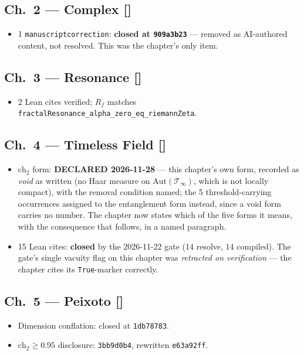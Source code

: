 \subsection*{Ch.~2 --- Complex \hfill [\checkmark]}
\begin{itemize}
\item 1 \texttt{manuscriptcorrection}: \textbf{closed at \texttt{909a3b23}} ---
removed as AI-authored content, not resolved. This was the chapter's only item.
\end{itemize}

\subsection*{Ch.~3 --- Resonance \hfill [\checkmark]}
\begin{itemize}
\item 2 Lean cites verified; $R_f$ matches \texttt{fractalResonance\_alpha\_zero\_eq\_riemannZeta}.
\end{itemize}

\subsection*{Ch.~4 --- Timeless Field \hfill [\checkmark]}
\begin{itemize}
\item $\mathrm{ch}_2$ form: \textbf{DECLARED 2026-11-28} --- this chapter's own form, recorded as \emph{void} as written (no Haar measure on $\mathrm{Aut}(\mathcal{T}_\infty)$, which is not locally compact), with the removal condition named; the 5 threshold-carrying occurrences assigned to the entanglement form instead, since a void form carries no number. The chapter now states which of the five forms it means, with the consequence that follows, in a named paragraph.
\item 15 Lean cites: \textbf{closed} by the 2026-11-22 gate (14 resolve, 14
compiled). The gate's single vacuity flag on this chapter was \emph{retracted
on verification} --- the chapter cites its \texttt{True}-marker correctly.
\end{itemize}

\subsection*{Ch.~5 --- Peixoto \hfill [\checkmark]}
\begin{itemize}
\item Dimension conflation: closed at \texttt{1db78783}.
\item $\mathrm{ch}_2 \geq 0.95$ disclosure: \texttt{3bb9d0b4}, rewritten \texttt{e63a92ff}.
\end{itemize}

